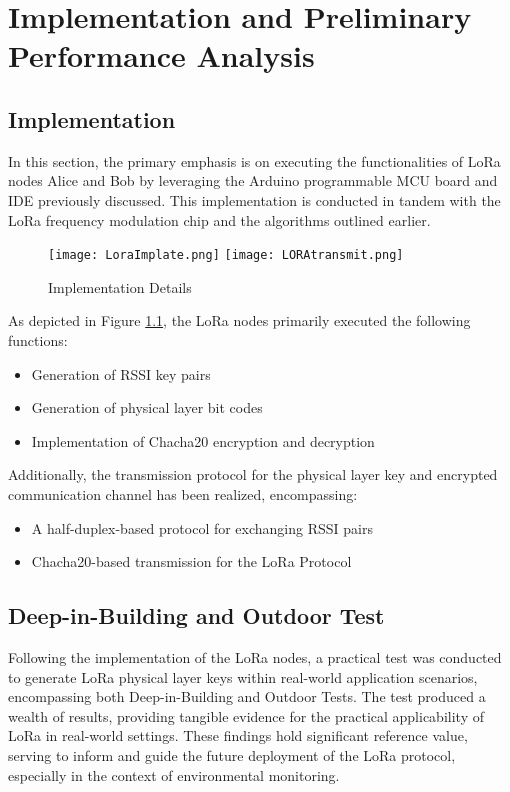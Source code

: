 
\chapter{Implementation and Preliminary Performance Analysis}

\section{Implementation}
In this section, the primary emphasis is on executing the functionalities of LoRa nodes Alice and Bob by leveraging the Arduino programmable MCU board and IDE previously discussed. This implementation is conducted in tandem with the LoRa frequency modulation chip and the algorithms outlined earlier.

\begin{figure}
  \centering
  {\texttt{[image: LoraImplate.png]}}
  {\texttt{[image: LORAtransmit.png]}}
  \caption{Implementation Details}\label{Implementation Details}
\end{figure}

As depicted in Figure \ref{Implementation Details}, the LoRa nodes primarily executed the following functions:

\begin{itemize}
  \item Generation of RSSI key pairs 
  \item Generation of physical layer bit codes
  \item Implementation of Chacha20 encryption and decryption
\end{itemize}

Additionally, the transmission protocol for the physical layer key and encrypted communication channel has been realized, encompassing:

\begin{itemize}
  \item A half-duplex-based protocol for exchanging RSSI pairs  
  \item Chacha20-based transmission for the LoRa Protocol
\end{itemize}


\section{Deep-in-Building and Outdoor Test}
Following the implementation of the LoRa nodes, a practical test was conducted to generate LoRa physical layer keys within real-world application scenarios, encompassing both Deep-in-Building and Outdoor Tests. The test produced a wealth of results, providing tangible evidence for the practical applicability of LoRa in real-world settings. These findings hold significant reference value, serving to inform and guide the future deployment of the LoRa protocol, especially in the context of environmental monitoring.

